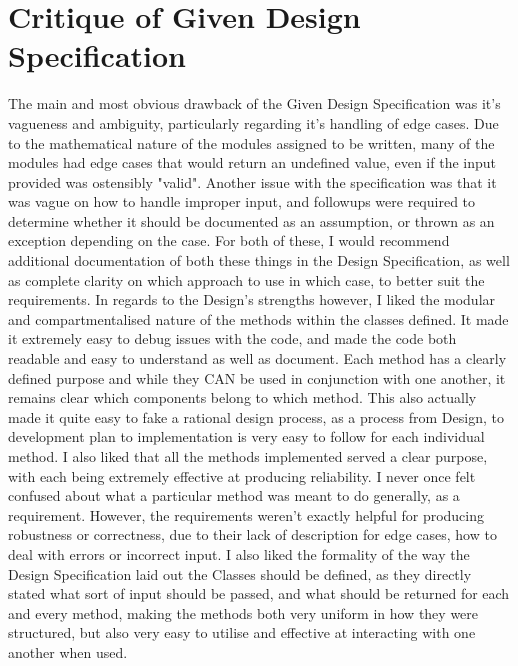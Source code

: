 \documentclass[12pt]{article}
\begin{document}
\section{Critique of Given Design Specification}
The main and most obvious drawback of the Given Design Specification was it's vagueness and ambiguity, particularly regarding it's handling of edge cases. Due to the mathematical nature of the modules assigned to be written, many of the modules had edge cases that would return an undefined value, even if the input provided was ostensibly "valid". Another issue with the specification was that it was vague on how to handle improper input, and followups were required to determine whether it should be documented as an assumption, or thrown as an exception depending on the case. For both of these, I would recommend additional documentation of both these things in the Design Specification, as well as complete clarity on which approach to use in which case, to better suit the requirements.
In regards to the Design's strengths however, I liked the modular and compartmentalised nature of the methods within the classes defined. It made it extremely easy to debug issues with the code, and made the code both readable and easy to understand as well as document. Each method has a clearly defined purpose and while they CAN be used in conjunction with one another, it remains clear which components belong to which method. This also actually made it quite easy to fake a rational design process, as a process from Design, to development plan to implementation is very easy to follow for each individual method. I also liked that all the methods implemented served a clear purpose, with each being extremely effective at producing reliability. I never once felt confused about what a particular method was meant to do generally, as a requirement. However, the requirements weren't exactly helpful for producing robustness or correctness, due to their lack of description for edge cases, how to deal with errors or incorrect input.
I also liked the formality of the way the Design Specification laid out the Classes should be defined, as they directly stated what sort of input should be passed, and what should be returned for each and every method, making the methods both very uniform in how they were structured, but also very easy to utilise and effective at interacting with one another when used. 
\end{document}
